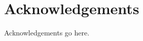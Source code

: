 \chapter*{\centering \Large \vspace{-20mm}\Huge Acknowledgements}

Acknowledgements go here.

\vspace{2cm}

\newpage

